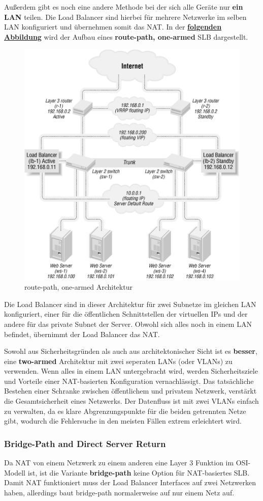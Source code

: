 Außerdem gibt es noch eine andere Methode bei der sich alle Geräte nur \textbf{ein LAN} teilen. Die Load Balancer sind hierbei für mehrere Netzwerke im selben LAN konfiguriert und übernehmen somit das NAT. In der \textbf{\hyperref[nat_slb_02]{folgenden Abbildung}} wird der Aufbau eines \textbf{route-path, one-armed} SLB dargestellt.
\begin{figure}[!h]
	\begin{center}
		\includegraphics[width=0.5\linewidth]{images/slb_0702}
		\caption{route-path, one-armed Architektur}
		\label{nat_slb_02}
	\end{center}
\end{figure}

Die Load Balancer sind in dieser Architektur für zwei Subnetze im gleichen LAN konfiguriert, einer für die öffentlichen Schnittstellen der virtuellen IPs und der andere für das private Subnet der Server. Obwohl sich alles noch in einem LAN befindet, übernimmt der Load Balancer das NAT.

Sowohl aus Sicherheitsgründen als auch aus architektonischer Sicht ist es \textbf{besser}, eine \textbf{two-armed} Architektur mit zwei seperaten LANs (oder VLANs) zu verwenden. Wenn alles in einem LAN untergebracht wird, werden Sicherheitsziele und Vorteile einer NAT-basierten Konfiguration vernachlässigt. Das tatsächliche Bestehen einer Schranke zwischen öffentlichem und privatem Netzwerk, verstärkt die Gesamtsicherheit eines Netzwerks. Der Datenfluss ist mit zwei VLANs einfach zu verwalten, da es klare Abgrenzungspunkte für die beiden getrennten Netze gibt, wodurch die Fehlersuche in den meisten Fällen extrem erleichtert wird.
\newpage

\subsubsection{Bridge-Path and Direct Server Return}
Da NAT von einem Netzwerk zu einem anderen eine Layer 3 Funktion im  OSI-Modell ist, ist die Variante \textbf{bridge-path} keine Option für NAT-basiertes SLB. Damit NAT funktioniert muss der Load Balancer Interfaces auf zwei Netzwerken haben, allerdings baut bridge-path normalerweise auf nur einem Netz auf.

